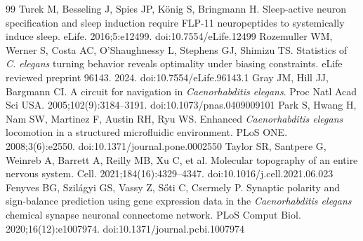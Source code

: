 \documentclass[11pt,a4paper]{article}
\begin{document}
\begin{thebibliography}{99}
 Turek M, Besseling J, Spies JP, K\"onig S, Bringmann H. Sleep-active neuron specification and sleep induction require FLP-11 neuropeptides to systemically induce sleep. eLife. 2016;5:e12499. doi:10.7554/eLife.12499
 Rozemuller WM, Werner S, Costa AC, O'Shaughnessy L, Stephens GJ, Shimizu TS. Statistics of \textit{C. elegans} turning behavior reveals optimality under biasing constraints. eLife reviewed preprint 96143. 2024. doi:10.7554/eLife.96143.1
 Gray JM, Hill JJ, Bargmann CI. A circuit for navigation in \textit{Caenorhabditis elegans}. Proc Natl Acad Sci USA. 2005;102(9):3184--3191. doi:10.1073/pnas.0409009101
 Park S, Hwang H, Nam SW, Martinez F, Austin RH, Ryu WS. Enhanced \textit{Caenorhabditis elegans} locomotion in a structured microfluidic environment. PLoS ONE. 2008;3(6):e2550. doi:10.1371/journal.pone.0002550
 Taylor SR, Santpere G, Weinreb A, Barrett A, Reilly MB, Xu C, et al. Molecular topography of an entire nervous system. Cell. 2021;184(16):4329--4347. doi:10.1016/j.cell.2021.06.023
 Fenyves BG, Szil\'agyi GS, Vassy Z, S\H{o}ti C, Csermely P. Synaptic polarity and sign-balance prediction using gene expression data in the \textit{Caenorhabditis elegans} chemical synapse neuronal connectome network. PLoS Comput Biol. 2020;16(12):e1007974. doi:10.1371/journal.pcbi.1007974
\end{thebibliography}
\end{document}
